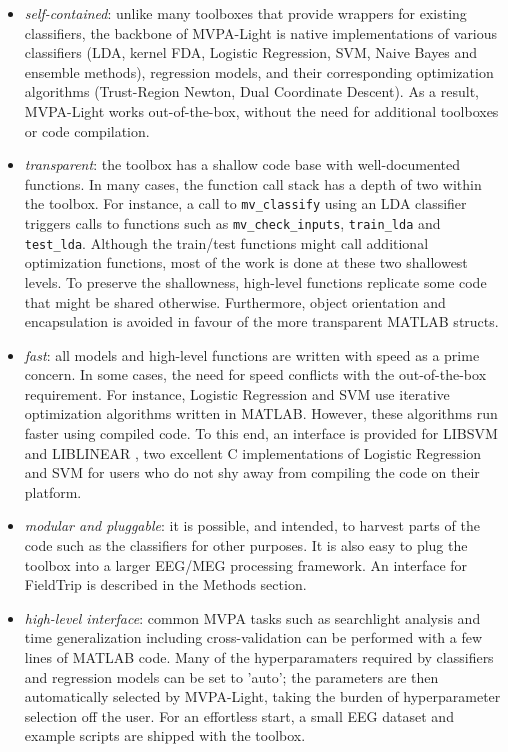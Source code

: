 \documentclass[utf8]{frontiersSCNS} %
\begin{document}
\begin{itemize}
\item \textit{self-contained}: unlike many toolboxes that provide wrappers for existing classifiers, the backbone of MVPA-Light is  native implementations of various classifiers (LDA, kernel FDA, Logistic Regression, SVM, Naive Bayes and ensemble methods), regression models, and their corresponding optimization algorithms (Trust-Region Newton, Dual Coordinate Descent). As a result, MVPA-Light works out-of-the-box, without the need for additional toolboxes or  code compilation.
\item \textit{transparent}: the toolbox has a shallow code base with well-documented functions. In many cases, the function call stack has a depth of two within the toolbox. For instance, a call to \texttt{mv\_classify} using an LDA classifier triggers calls to functions such as  \texttt{mv\_check\_inputs}, \texttt{train\_lda} and \texttt{test\_lda}. Although the train/test functions might call additional optimization functions, most of the work is done at these two shallowest levels. To preserve the shallowness, high-level functions replicate some code that might be shared otherwise. Furthermore, object orientation and encapsulation is avoided in favour of the more transparent MATLAB structs.
\item \textit{fast}: all models and high-level functions are written with speed as a prime concern. In some cases, the need for speed conflicts with the out-of-the-box requirement. For instance, Logistic Regression and SVM use iterative optimization algorithms written in MATLAB. However, these algorithms run faster using compiled code. To this end, an interface is provided for LIBSVM \citep{Chang2011LIBSVM:Machines} and LIBLINEAR \citep{Fan2008}, two excellent C implementations of Logistic Regression and SVM for users who do not shy away from compiling the code on their platform.
\item \textit{modular and pluggable}: it is possible, and intended, to harvest parts of the code such as the classifiers for other purposes. It is also easy to plug the toolbox into a larger EEG/MEG processing framework. An interface for FieldTrip \citep{Oostenveld2011} is described in the Methods section.
\item \textit{high-level interface}: common MVPA tasks such as searchlight analysis and time generalization including cross-validation can be performed with a few lines of MATLAB code. Many of the hyperparamaters required by classifiers and regression models can be set to 'auto'; the parameters are then automatically selected by MVPA-Light, taking the burden of hyperparameter selection off the user. For an effortless start, a small EEG dataset and example scripts are shipped with the toolbox.
\end{itemize}
\end{document}
